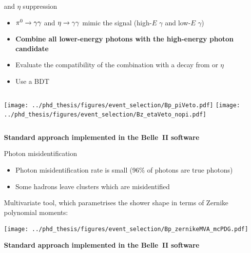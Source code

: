 \documentclass[xcolor=dvipsnames]{beamer}
\begin{document}
\begin{frame}{\piz and $\eta$ suppression}
   \scriptsize\centering
\begin{itemize}
   \item $\pi^0\rightarrow\gamma\gamma$ and $\eta\rightarrow\gamma\gamma$ mimic the signal (high-$E$ $\gamma$ and low-$E$ $\gamma$)
   \item \textbf{Combine all lower-energy photons with the high-energy photon candidate}
   \item Evaluate the compatibility of the combination with a decay from \piz or $\eta$
   \item[\ra] Use a BDT
\end{itemize}
\begin{columns}
   \texttt{[image: ../phd\_thesis/figures/event\_selection/Bp\_piVeto.pdf]}
   \texttt{[image: ../phd\_thesis/figures/event\_selection/Bz\_etaVeto\_nopi.pdf]}
\end{columns}

\begin{flushright}
\textbf{Standard approach implemented in the Belle~II software}
\end{flushright}
\end{frame}

\begin{frame}{Photon misidentification}
\centering   \scriptsize


\begin{itemize}
   \item Photon misidentification rate is small (96\% of photons are true photons)
   \item Some hadrons leave clusters which are misidentified
\end{itemize}

\vspace{5pt}

Multivariate tool, which parametrises the shower shape in terms of Zernike polynomial moments:

\vspace{5pt}

\texttt{[image: ../phd\_thesis/figures/event\_selection/Bp\_zernikeMVA\_mcPDG.pdf]}


\begin{flushright}
   \textbf{Standard approach implemented in the Belle~II software}
   \end{flushright}

\end{frame}
\end{document}

